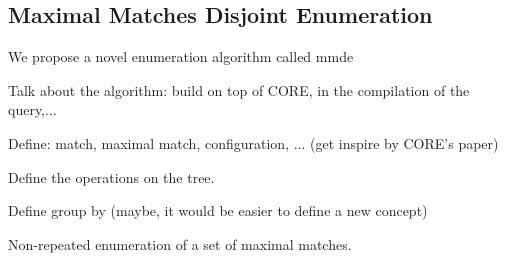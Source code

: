 \subsection{Maximal Matches Disjoint Enumeration}\label{subsec:mmde}

We propose a novel enumeration algorithm called \acrfull{mmde}

Talk about the algorithm: build on top of CORE, in the compilation of the query,...

Define: match, maximal match, configuration, ... (get inspire by CORE's paper)

Define the operations on the tree.

Define group by (maybe, it would be easier to define a new concept)

\begin{algorithm}[H]
  \DontPrintSemicolon
  \SetAlgoNoEnd %
  \SetAlgoNoLine %
  \LinesNumbered

  \;
\caption{Non-repeated enumeration of a set of maximal matches.}
\label{algo:mmde}
\end{algorithm}

